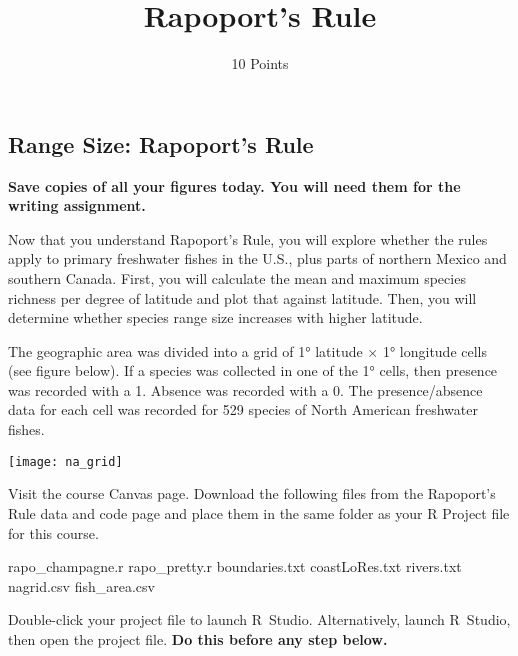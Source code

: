 \documentclass[11pt]{article}
\title{Rapoport's Rule}
\author{10 Points}
\date{}                                           %
\begin{document}
\thispagestyle{first_page}

\subsection*{Range Size: Rapoport's Rule} %

\textbf{Save copies of all your figures today. You will need them for the
writing assignment.}

Now that you understand Rapoport's Rule, you will explore whether the 
rules apply to primary freshwater fishes in the U.S., plus parts of 
northern Mexico and southern Canada. First, you will calculate the 
mean and maximum species richness per degree of latitude and plot that 
against latitude. Then, you will determine whether species range size 
increases with higher latitude.

The geographic area was divided into a grid of 1° latitude $\times$ 1°
longitude cells (see figure below). If a species was collected in one 
of the 1° cells, then presence was recorded with a 1. Absence was 
recorded with a 0. The presence/absence data for each cell was 
recorded for 529 species of North American freshwater fishes.

\begin{center}
	\texttt{[image: na\_grid]}
\end{center}

Visit the course Canvas page.  Download the following files from the Rapoport's Rule data and code page and place them in the same folder as your R Project file for this course.


\hspace*{1em} rapo\_champagne.r \newline
\hspace*{1em} rapo\_pretty.r\newline
\hspace*{1em} boundaries.txt \newline
\hspace*{1em} coastLoRes.txt \newline
\hspace*{1em} rivers.txt \newline
\hspace*{1em} nagrid.csv \newline
\hspace*{1em} fish\_area.csv


Double-click your project file to launch R~Studio. Alternatively, launch R~Studio, then open the project file. \textbf{Do this before any step below.}
\end{document}
